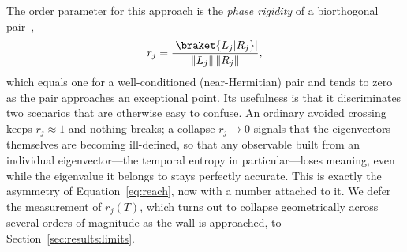 The order parameter for this approach is the \emph{phase rigidity} of a biorthogonal pair~\cite{rotter2009},
\begin{equation}
    r_j = \frac{|\braket{L_j|R_j}|}{\lVert L_j\rVert\,\lVert R_j\rVert},
    \label{eq:rigidity}
\end{equation}
which equals one for a well-conditioned (near-Hermitian) pair and tends to zero as the pair approaches an exceptional point. Its usefulness is that it discriminates two scenarios that are otherwise easy to confuse. An ordinary avoided crossing keeps $r_j\approx1$ and nothing breaks; a collapse $r_j\to0$ signals that the eigenvectors themselves are becoming ill-defined, so that any observable built from an individual eigenvector---the temporal entropy in particular---loses meaning, even while the eigenvalue it belongs to stays perfectly accurate. This is exactly the asymmetry of Equation~\eqref{eq:reach}, now with a number attached to it. We defer the measurement of $r_j(T)$, which turns out to collapse geometrically across several orders of magnitude as the wall is approached, to Section~\ref{sec:results:limits}.
